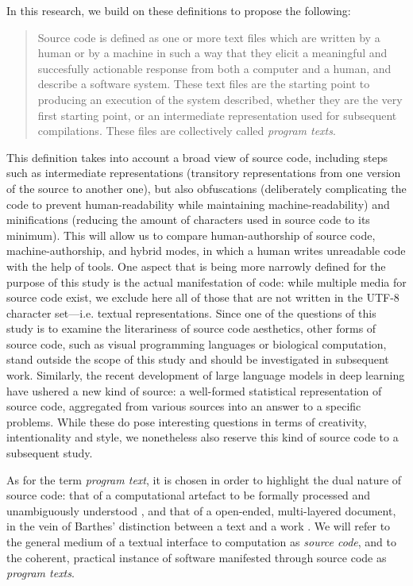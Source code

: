 In this research, we build on these definitions to propose the following:

\begin{quote}
    Source code is defined as one or more text files which are written by a human or by a machine in such a way that they elicit a meaningful and succesfully actionable response from both a computer and a human, and describe a software system. These text files are the starting point to producing an execution of the system described, whether they are the very first starting point, or an intermediate representation used for subsequent compilations. These files are collectively called \emph{program texts}.
\end{quote}

This definition takes into account a broad view of source code, including steps such as intermediate representations (transitory representations from one version of the source to another one), but also obfuscations (deliberately complicating the code to prevent human-readability while maintaining machine-readability) and minifications (reducing the amount of characters used in source code to its minimum). This will allow us to compare human-authorship of source code, machine-authorship, and hybrid modes, in which a human writes unreadable code with the help of tools. One aspect that is being more narrowly defined for the purpose of this study is the actual manifestation of code: while multiple media for source code exist, we exclude here all of those that are not written in the UTF-8 character set—i.e. textual representations. Since one of the questions of this study is to examine the literariness of source code aesthetics, other forms of source code, such as visual programming languages or biological computation, stand outside the scope of this study and should be investigated in subsequent work. Similarly, the recent development of large language models in deep learning have ushered a new kind of source: a well-formed statistical representation of source code, aggregated from various sources into an answer to a specific problems. While these do pose interesting questions in terms of creativity, intentionality and style, we nonetheless also reserve this kind of source code to a subsequent study.

As for the term \emph{program text}, it is chosen in order to highlight the dual nature of source code: that of a computational artefact to be formally processed and unambiguously understood \citep{detienne_software_2001}, and that of a open-ended, multi-layered document, in the vein of Barthes' distinction between a text and a work \citep{barthes_bruissement_1984}. We will refer to the general medium of a textual interface to computation as \emph{source code}, and to the coherent, practical instance of software manifested through source code as \emph{program texts}.

